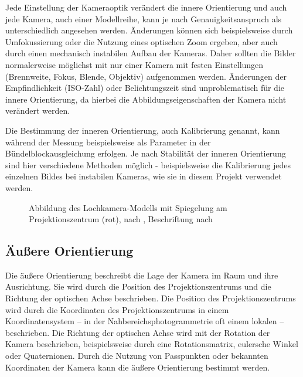 \documentclass[./00PhotoBox.tex]{subfiles}
\begin{document}
Jede Einstellung der Kameraoptik verändert die innere Orientierung und auch jede Kamera, auch einer Modellreihe, kann je nach Genauigkeitsanspruch als unterschiedlich angesehen werden. Änderungen können sich beispielsweise durch Umfokussierung oder die Nutzung eines optischen Zoom ergeben, aber auch durch einen mechanisch instabilen Aufbau der Kameras. Daher sollten die Bilder normalerweise möglichst mit nur einer Kamera mit festen Einstellungen (Brennweite, Fokus, Blende, Objektiv) aufgenommen werden. Änderungen der Empfindlichkeit (ISO-Zahl) oder Belichtungszeit sind unproblematisch für die innere Orientierung, da hierbei die Abbildungseigenschaften der Kamera nicht verändert werden. \citep[S. 176]{luhmann}

Die Bestimmung der inneren Orientierung, auch Kalibrierung genannt, kann wäh\-rend der Messung beispielsweise als Parameter in der Bündel\-block\-ausgleichung erfolgen. Je nach Stabilität der inneren Orientierung sind hier verschiedene Methoden möglich - beispielsweise die Kalibrierung jedes einzelnen Bildes bei instabilen Kameras, wie sie in diesem Projekt verwendet werden. \citep[S. 181f]{luhmann}

\begin{figure}
    \centering
    
    \caption{Abbildung des Lochkamera-Modells mit Spiegelung am Projektionszentrum (rot), nach \citealt[S. 154]{hartley}, Beschriftung nach \citealt{luhmann}} %
    \label{img:optische_achse}
\end{figure}


\subsection{Äußere Orientierung}
\label{s:aeussereorientierung}
Die äußere Orientierung beschreibt die Lage der Kamera im Raum und ihre Ausrichtung. Sie wird durch die Position des Projektionszentrums und die Richtung der optischen Achse beschrieben. Die Position des Projektionszentrums wird durch die Koordinaten des Projektionszentrums in einem Koordinatensystem -- in der Nahbereichsphotogrammetrie oft einem lokalen -- beschrieben. Die Richtung der optischen Achse wird mit der Rotation der Kamera beschrieben, beispielsweise durch eine Rotationsmatrix, eulersche Winkel oder Quaternionen. Durch die Nutzung von Passpunkten oder bekannten Koordinaten der Kamera kann die äußere Orientierung bestimmt werden. \citep[S. 273ff]{luhmann}
\end{document}
